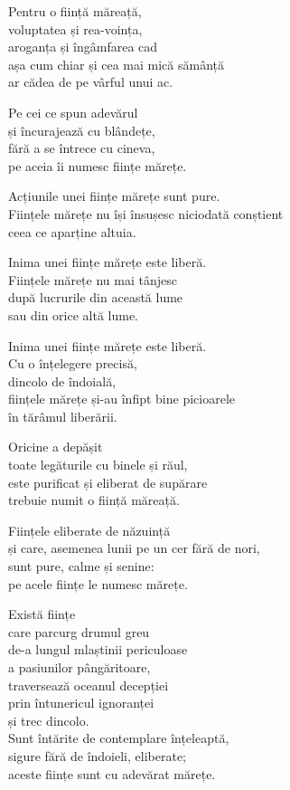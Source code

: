 Pentru o ființă măreață,\\
voluptatea și rea-voința,\\
aroganța și îngâmfarea cad\\
așa cum chiar și cea mai mică sămânță\\
ar cădea de pe vârful unui ac.


Pe cei ce spun adevărul\\
și încurajează cu blândețe,\\
fără a se întrece cu cineva,\\
pe aceia îi numesc ființe mărețe.


Acțiunile unei ființe mărețe sunt pure.\\
Ființele mărețe nu își însușesc niciodată conștient\\
ceea ce aparține altuia.

Inima unei ființe mărețe este liberă.\\
Ființele mărețe nu mai tânjesc\\
după lucrurile din această lume\\
sau din orice altă lume.


Inima unei ființe mărețe este liberă.\\
Cu o înțelegere precisă,\\
dincolo de îndoială,\\
ființele mărețe și-au înfipt bine picioarele\\
în tărâmul liberării.


Oricine a depășit\\
toate legăturile cu binele și răul,\\
este purificat și eliberat de supărare\\
trebuie numit o ființă măreață.


Ființele eliberate de năzuință\\
și care, asemenea lunii pe un cer fără de nori,\\
sunt pure, calme și senine:\\
pe acele ființe le numesc mărețe.


Există ființe\\
care parcurg drumul greu\\
de-a lungul mlaștinii periculoase\\
a pasiunilor pângăritoare,\\
traversează oceanul decepției\\
prin întunericul ignoranței\\
și trec dincolo.\\
Sunt întărite de contemplare înțeleaptă,\\
sigure fără de îndoieli, eliberate;\\
aceste ființe sunt cu adevărat mărețe.


